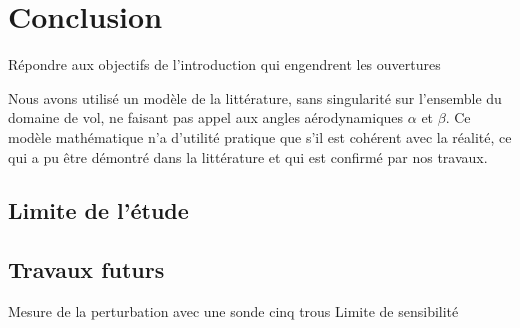 \chapter*{Conclusion}
{ \color{red}
Répondre aux objectifs de l'introduction qui engendrent les ouvertures

Nous avons utilisé un modèle de la littérature, sans singularité sur l'ensemble du domaine de vol, ne faisant pas appel aux angles aérodynamiques $\alpha$ et $\beta$. Ce modèle mathématique n'a d'utilité pratique que s'il est cohérent avec la réalité, ce qui a pu être démontré dans la littérature et qui est confirmé par nos travaux.

\section{Limite de l'étude}

\section{Travaux futurs}

Mesure de la perturbation avec une sonde cinq trous
Limite de sensibilité

}